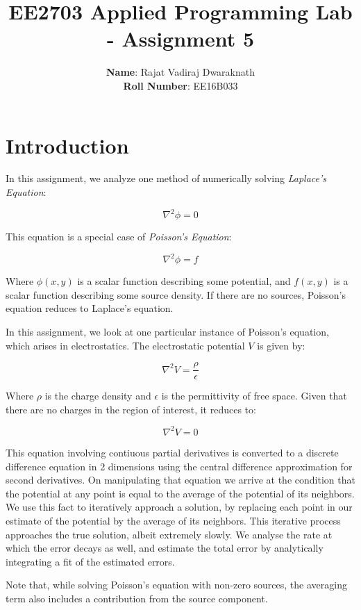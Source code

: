 \documentclass[11pt]{article}
\title{EE2703 Applied Programming Lab - Assignment 5}
\author{
  \textbf{Name}: Rajat Vadiraj Dwaraknath\\
  \textbf{Roll Number}: EE16B033
}
\begin{document}
    
    
    \maketitle
    
    

    
	

	
		
    \section{Introduction}\label{introduction}

In this assignment, we analyze one method of numerically solving
\emph{Laplace's Equation}:

\[\nabla^2 \phi = 0\]

This equation is a special case of \emph{Poisson's Equation}:

\[\nabla^2 \phi = f\]

Where \(\phi(x,y)\) is a scalar function describing some potential, and
\(f(x,y)\) is a scalar function describing some source density. If there
are no sources, Poisson's equation reduces to Laplace's equation.

In this assignment, we look at one particular instance of Poisson's
equation, which arises in electrostatics. The electrostatic potential
\(V\) is given by:

\[\nabla^2 V = \frac{\rho}{\epsilon}\]

Where \(\rho\) is the charge density and \(\epsilon\) is the
permittivity of free space. Given that there are no charges in the
region of interest, it reduces to:

\[\nabla^2 V = 0\]

This equation involving contiuous partial derivatives is converted to a
discrete difference equation in 2 dimensions using the central
difference approximation for second derivatives. On manipulating that
equation we arrive at the condition that the potential at any point is
equal to the average of the potential of its neighbors. We use this fact
to iteratively approach a solution, by replacing each point in our
estimate of the potential by the average of its neighbors. This
iterative process approaches the true solution, albeit extremely slowly.
We analyse the rate at which the error decays as well, and estimate the
total error by analytically integrating a fit of the estimated errors.

Note that, while solving Poisson's equation with non-zero sources, the
averaging term also includes a contribution from the source component.
\end{document}
